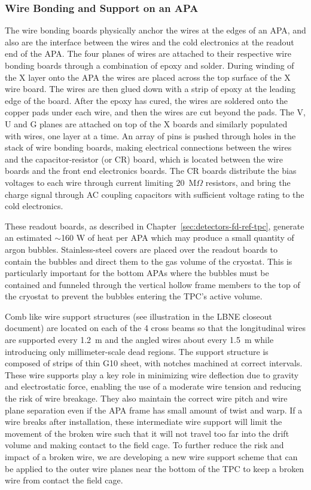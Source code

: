 \subsubsection{Wire Bonding and Support on an APA}
\label{subsec:fd-ref-wirewrap}


The wire bonding boards physically anchor the wires at the edges of an APA, and also are the interface between the wires and the cold electronics  at the readout end of the APA.  The four planes of wires are attached to their respective wire bonding boards through a combination of epoxy and solder. During winding of the X layer onto the APA the wires are placed across the top surface of the X wire board. The wires are then glued down with a strip of epoxy at the leading edge of the board.  After the epoxy has cured, the wires are soldered onto the copper pads under each wire, and then the wires are cut beyond the pads. The V, U and G planes are attached on top of the X boards and similarly populated with wires, one layer at a time. An array of pins is pushed through holes in the stack of wire bonding boards, making electrical connections between the wires and the capacitor-resistor (or CR) board, which is located between the wire boards and the front end electronics boards.  The CR boards distribute the bias voltages to each wire through current limiting 20~M$\Omega$ resistors,  and bring the charge signal through AC coupling capacitors with sufficient voltage rating to the cold electronics.

These readout boards, as described in Chapter~\ref{sec:detectors-fd-ref-tpc}, generate an estimated $\sim$160 W of heat per APA which may produce a small quantity of argon bubbles.  Stainless-steel covers are placed over the readout boards to contain the bubbles and direct them to the gas volume of the cryostat. This is particularly important for the bottom APAs where the bubbles must be contained and funneled through the vertical hollow frame members to the top of the cryostat to prevent the bubbles entering the TPC's active volume.

Comb like wire support structures (see illustration in the LBNE closeout document) are located on each of the 4 cross beams so that the longitudinal wires are supported every 1.2~m and the angled wires about every 1.5~m while introducing only millimeter-scale dead regions. The support structure is composed of strips of thin G10 sheet, with notches machined at correct intervals.  These wire supports play a key role in minimizing wire deflection due to gravity and electrostatic force, enabling the use of a moderate wire tension and reducing the risk of wire breakage.   They also maintain the correct wire pitch and wire plane separation even if the APA frame has small amount of twist and warp.  If a wire breaks after installation, these intermediate wire support will limit the movement of the broken wire such that it will not travel too far into the drift volume and making contact to the field cage.  To further reduce the risk and impact of a broken wire, we are developing a new wire support scheme that can be applied to the outer wire planes near the bottom of the TPC to keep a broken wire from contact the field cage. 


